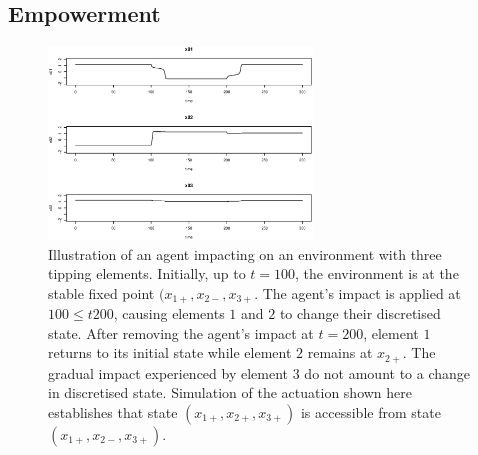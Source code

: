 \documentclass[conference]{IEEEtran}
\begin{document}


\subsection{Empowerment}
\label{section_empowerment}

\begin{figure}

  \centerline{\includegraphics[width=7cm]{agentimpact_ode.eps}}

  \caption{Illustration of an agent impacting on an environment with
    three tipping elements. Initially, up to $t = 100$, the
    environment is at the stable fixed point $(x_{1+}, x_{2-}, x_{3+}$. The agent's impact is
    applied at $100 \le t  200$, causing elements $1$ and $2$ to change
    their discretised state. After removing the agent's impact at $t =
    200$, element $1$ returns to its initial state while element $2$
    remains at $x_{2+}$. The gradual impact experienced by element $3$
    do not amount to a change in discretised state. Simulation of the
    actuation shown here establishes that state $(x_{1+}, x_{2+},
    x_{3+})$ is accessible from state $(x_{1+}, x_{2-}, x_{3+})$.}
  \label{fig_agentimpact}
\end{figure}


\end{document}
